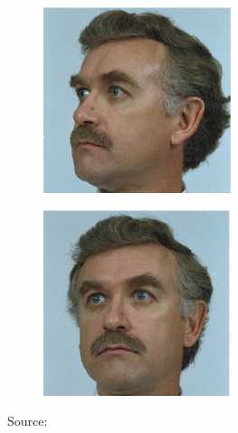 \documentclass[xetex,aspectratio=169,xcolor,professionalfonts,hyperref]{beamer}
\begin{document}
\begin{frame}
{{\begin{figure}[hb]
\begin{subfigure}[b]{0.24\columnwidth}
            \end{subfigure}
            \hfill
            \begin{subfigure}[b]{0.24\columnwidth}
                \centering
                \includegraphics[width=\columnwidth]{figures/face3.png}
            \end{subfigure}
            \hfill
            \begin{subfigure}[b]{0.24\columnwidth}
                \centering
                \includegraphics[width=\columnwidth]{figures/face4.png}
            \end{subfigure}
            \caption{Source: \cite{faces}}
            \label{fig:rotation}
        \end{figure}
    }}


\end{frame}
\end{document}
